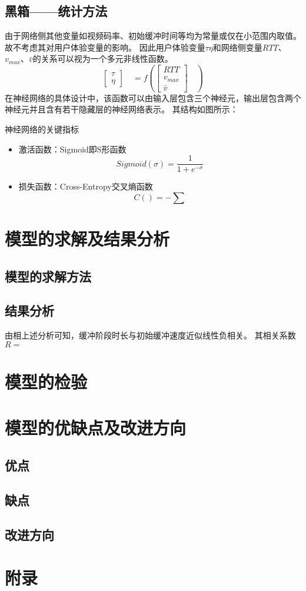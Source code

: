\documentclass[UTF8]{ctexart}
\begin{document}
\subsection{黑箱——统计方法}
由于网络侧其他变量如视频码率、初始缓冲时间等均为常量或仅在小范围内取值。
故不考虑其对用户体验变量的影响。
因此用户体验变量$\tau$$\eta$和网络侧变量$RTT$、$v_{max}$、$\bar{v}$的关系可以视为一个多元非线性函数。
\begin{equation}
    \begin{bmatrix} \tau\\\eta \end{bmatrix} \quad=f(\begin{bmatrix} RTT\\v_{max}\\\bar
    {v} \end{bmatrix} \quad)
\end{equation}
在神经网络的具体设计中，该函数可以由输入层包含三个神经元，输出层包含两个神经元并且含有若干隐藏层的神经网络表示。
其结构如图所示：

神经网络的关键指标
\begin{itemize}
    \item 激活函数：Sigmoid即S形函数
    \[Sigmoid(\sigma)=\frac{1}{1+e^{-\sigma}}\]
    \item 损失函数：Cross-Entropy交叉熵函数
    \[C()=-\sum\]
\end{itemize}



\section{模型的求解及结果分析}

\subsection{模型的求解方法}
\subsection{结果分析}
由相上述分析可知，缓冲阶段时长与初始缓冲速度近似线性负相关。
其相关系数 $R= $

\section{模型的检验}
\section{模型的优缺点及改进方向}
\subsection{优点}
\subsection{缺点}
\subsection{改进方向}
\section{附录}
\end{document}
